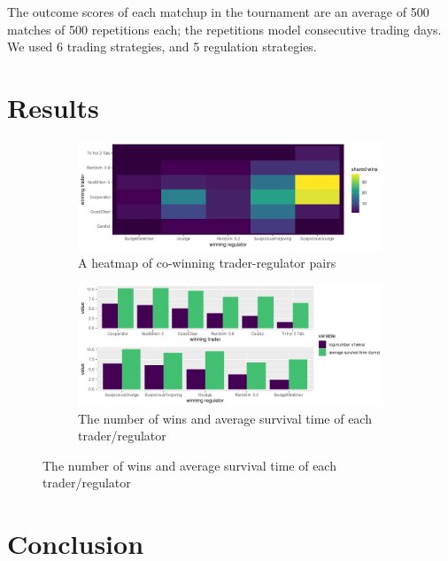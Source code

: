 \documentclass{article}
\begin{document}
The outcome scores of each matchup in the tournament are an average of 500 matches of 500 repetitions each; the repetitions model consecutive trading days. We used 6 trading strategies, and 5 regulation strategies.

\section{Results}
\begin{figure}[!h]
  \begin{subfigure}[b]{0.4\textwidth}
    \includegraphics[width=\textwidth]{heatmap.png}
    \caption{A heatmap of co-winning trader-regulator pairs}
    \label{fig:f1}
  \end{subfigure}
  \hfill
  \begin{subfigure}[b]{0.4\textwidth}
    \includegraphics[width=\textwidth]{barplot.png}
    \caption{The number of wins and average survival time of each trader/regulator}
    \label{fig:f2}
  \end{subfigure}
\end{figure}

\section{Conclusion}


\end{document}
